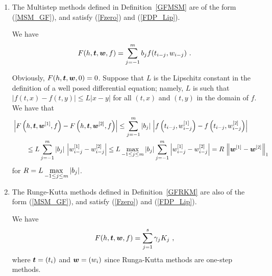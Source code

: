 \begin{enumerate}
\item The Multistep methods defined in Definition~\ref{GFMSM} are of the
form (\ref{MSM_GF}), and satisfy (\ref{Fzero}) and (\ref{FDP_Lip}).

We have
\[
F(h,\bm{t},\bm{w},f) = \sum_{j=-1}^m b_j f(t_{i-j},w_{i-j}) \ .
\]

Obviously, $F(h,\bm{t},\bm{w},0) = 0$.  Suppose that $L$ is the
Lipschitz constant in the definition of a well posed differential
equation; namely, $L$ is such that
$|f(t,x)-f(t,y)| \leq L |x-y|$ for all $(t,x)$ and $(t,y)$ in
the domain of $f$.  We have that
\begin{align*}
&\left| F\left(h,\bm{t},\bm{w}^{[1]},f\right)
- F\left(h,\bm{t},\bm{w}^{[2]},f\right) \right|
\leq \sum_{j=-1}^m |b_j|\,
\left| f\left(t_{i-j},w_{i-j}^{[1]}\right)
- f\left(t_{i-j},w_{i-j}^{[2]}\right) \right| \\
& \qquad
\leq L \sum_{j=-1}^m |b_j|\, \left| w_{i-j}^{[1]} - w_{i-j}^{[2]} \right|
\leq L \max_{-1 \leq j \leq m} |b_j| 
\sum_{j=-1}^m \left| w_{i-j}^{[1]} - w_{i-j}^{[2]} \right|
= R \, \left\|\bm{w}^{[1]}-\bm{w}^{[2]} \right\|_1
\end{align*}
for $\displaystyle R = L \max_{-1 \leq j \leq m} |b_j|$.
\item The Runge-Kutta methods defined in Definition~\ref{GFRKM} are also
of the form (\ref{MSM_GF}), and satisfy (\ref{Fzero}) and (\ref{FDP_Lip}).

We have
\[
  F(h,\bm{t},\bm{w},f) = \sum_{j=1}^s \gamma_j K_j \ ,
\]
where $\bm{t} = (t_i)$ and $\bm{w} = (w_i)$ since Runga-Kutta methods
are one-step methods.


\end{enumerate}

